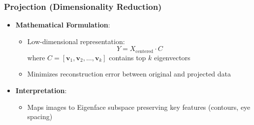 \documentclass{article}
\begin{document}
	\subsubsection{Projection (Dimensionality Reduction)}\cite{Jolliffe2002}
	\begin{itemize}
		\item \textbf{Mathematical Formulation}:
		\begin{itemize}
			\item Low-dimensional representation: 
			\[
			Y = X_{\text{centered}} \cdot C
			\]
			where $C = [\mathbf{v}_1, \mathbf{v}_2, \dots, \mathbf{v}_k]$ contains top $k$ eigenvectors
			\item Minimizes reconstruction error between original and projected data
		\end{itemize}
		
		\item \textbf{Interpretation}:
		\begin{itemize}
			\item Maps images to Eigenface subspace preserving key features (contours, eye spacing) 
		\end{itemize}
	\end{itemize}
	
\end{document}
